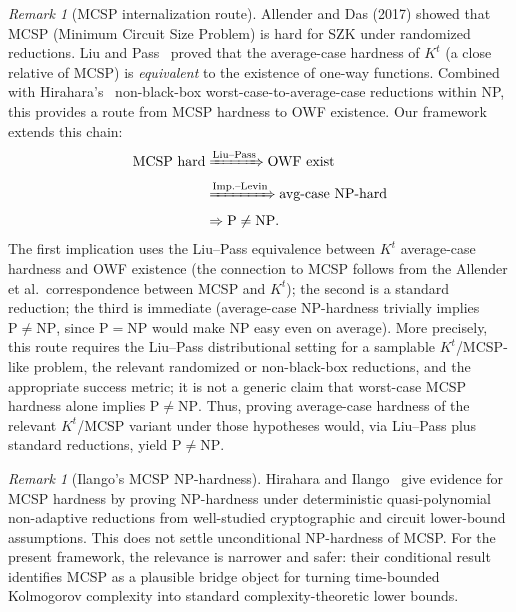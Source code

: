 \documentclass[aps,prd,twocolumn,superscriptaddress,nofootinbib]{revtex4-2}
\theoremstyle{definition}
\theoremstyle{remark}
\newtheorem{remark}[theorem]{Remark}
\newcommand{\NP}{\mathrm{NP}}
\newcommand{\PP}{\mathrm{P}}
\begin{document}
\begin{remark}[MCSP internalization route]
\label{rem:mcsp-internalization}
Allender and Das (2017) showed that MCSP (Minimum Circuit Size Problem) is hard for SZK under randomized reductions. Liu and Pass~\cite{LiuPass2020} proved that the average-case hardness of $K^t$ (a close relative of MCSP) is \emph{equivalent} to the existence of one-way functions. Combined with Hirahara's~\cite{Hirahara2018} non-black-box worst-case-to-average-case reductions within NP, this provides a route from MCSP hardness to OWF existence. Our framework extends this chain:
\[
\begin{aligned}
\text{MCSP hard}
&\xRightarrow{\text{Liu--Pass}} \text{OWF exist}\\
&\xRightarrow{\text{Imp.--Levin}} \text{avg-case NP-hard}\\
&\Rightarrow \PP \neq \NP .
\end{aligned}
\]
The first implication uses the Liu--Pass equivalence between $K^t$ average-case hardness and OWF existence (the connection to MCSP follows from the Allender et al.\ correspondence between MCSP and $K^t$); the second is a standard reduction; the third is immediate (average-case NP-hardness trivially implies $\PP \neq \NP$, since $\PP = \NP$ would make NP easy even on average). More precisely, this route requires the Liu--Pass distributional setting for a samplable $K^t$/MCSP-like problem, the relevant randomized or non-black-box reductions, and the appropriate success metric; it is not a generic claim that worst-case MCSP hardness alone implies $\PP \neq \NP$. Thus, proving average-case hardness of the relevant $K^t$/MCSP variant under those hypotheses would, via Liu--Pass plus standard reductions, yield $\PP \neq \NP$.
\end{remark}

\begin{remark}[Ilango's MCSP NP-hardness]\label{rem:ilango-mcsp}
Hirahara and Ilango~\cite{Ilango2025} give evidence for MCSP hardness by proving NP-hardness under deterministic quasi-polynomial non-adaptive reductions from well-studied cryptographic and circuit lower-bound assumptions. This does not settle unconditional NP-hardness of MCSP. For the present framework, the relevance is narrower and safer: their conditional result identifies MCSP as a plausible bridge object for turning time-bounded Kolmogorov complexity into standard complexity-theoretic lower bounds.
\end{remark}
\end{document}
